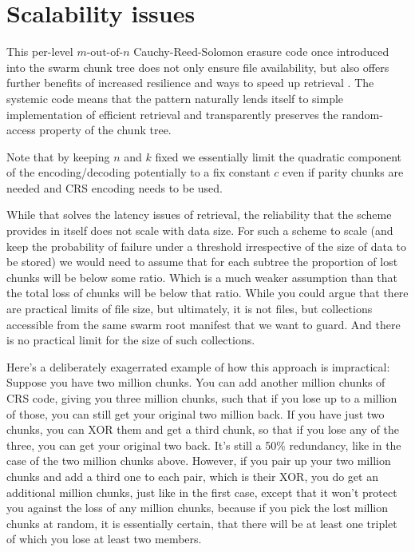 \documentclass[12pt]{article}
\begin{document}
\section{Scalability issues}

This per-level $m\text{-out-of-}n$ Cauchy-Reed-Solomon erasure code once introduced into the swarm chunk tree does not only ensure file availability, but also offers further benefits of increased resilience and ways to speed up retrieval \cite{ethersphere2016sw3}.
The systemic code means that the pattern naturally lends itself to simple implementation of efficient retrieval and transparently preserves the random-access property of the chunk tree.

Note that by keeping $n$ and $k$ fixed we essentially limit the quadratic component of the encoding/decoding potentially to a fix constant $c$ even if parity chunks are needed and CRS encoding needs to be used.

While that solves the latency issues of retrieval, the reliability that the scheme provides in itself does not scale with data size. For such a scheme to scale (and keep the probability of failure under a threshold irrespective of the size of data to be stored) we would need to assume that for each subtree the proportion of lost chunks will be below some ratio. Which is a much weaker assumption than that the total loss of chunks will be below that ratio. While you could argue that there are practical limits of file size, but ultimately, it is not files, but collections accessible from the same swarm root manifest that we want to guard. And there is no practical limit for the size of such collections.



Here's a deliberately exagerrated example of how this approach is impractical:
Suppose you have two million chunks. You can add another million chunks of CRS code, giving you three million chunks, such that if you lose up to a million of those, you can still get your original two million back.
If you have just two chunks, you can XOR them and get a third chunk, so that if you lose any of the three, you can get your original two back. It's still a 50\% redundancy, like in the case of the two million chunks above. However, if you pair up your two million chunks and add a third one to each pair, which is their XOR, you do get an additional million chunks, just like in the first case, except that it won't protect you against the loss of any million chunks, because if you pick the lost million chunks at random, it is essentially certain, that there will be at least one triplet of which you lose at least two members.
\end{document}
